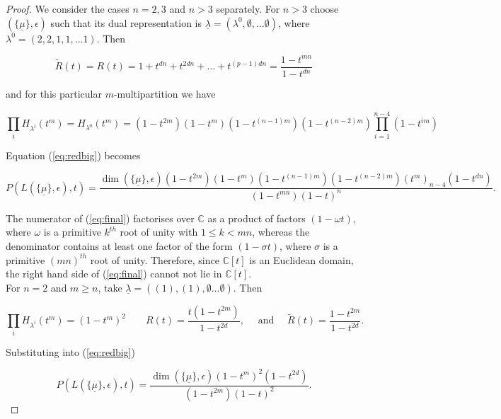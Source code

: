 \documentclass[a4apper,10pt]{amsart}
\theoremstyle{definition}
\numberwithin{thm}{section}
\newcommand{\C}{\mathbb{C}}
\begin{document}
\begin{proof}We consider the cases $n = 2,3$ and $n > 3$ separately. For $n > 3$ choose $( \{ \underline{\mu} \},\epsilon)$ such that its dual representation is $\underline{\lambda} = (\lambda^0, \emptyset, \dots \emptyset )$, where $\lambda^0 = (2,2,1,1, \dots 1)$. Then 

\begin{displaymath}
\tilde{R}(t) = R(t) = 1 + t^{dn} + t^{2dn} + \dots + t^{(p-1)dn} = \frac{1 - t^{mn}}{1 - t^{dn}}
\end{displaymath}

\noindent and for this particular $m$-multipartition we have

\begin{displaymath}
\prod_i H_{\lambda^i}(t^m) = H_{\lambda^0}(t^m) = (1 - t^{2m})(1 - t^m)(1 - t^{(n-1)m})(1 - t^{(n-2)m})\prod_{i = 1}^{n-4} (1-t^{im})
\end{displaymath}

\noindent Equation (\ref{eq:redbig}) becomes

\begin{equation}\label{eq:final}
P(L( \{ \underline{\mu} \},\epsilon),t) = \frac{\dim ( \{ \underline{\mu} \},\epsilon) (1 - t^{2m})(1 - t^m)(1 - t^{(n-1)m})(1 - t^{(n-2)m})(t^m)_{n-4} (1 - t^{dn})  }{(1 - t^{mn})(1-t)^n}.
\end{equation}

\noindent The numerator of (\ref{eq:final}) factorises over $\C$ as a product of factors $(1 - \omega t)$, where $\omega$ is a primitive $k^{th}$ root of unity with $1 \le k < mn$, whereas the denominator contains at least one factor of the form $(1 - \sigma t)$, where $\sigma$ is a primitive $(mn)^{th}$ root of unity. Therefore, since $\C[t]$ is an Euclidean domain, the right hand side of (\ref{eq:final}) cannot not lie in $\C [t]$.\\

\noindent For $n = 2$ and $m \ge n$, take $\underline{\lambda} = ((1), (1), \emptyset \dots \emptyset )$. Then

\begin{displaymath}
\prod_i H_{\lambda^i}(t^m) = (1 - t^m)^2 \qquad R(t) = \frac{t(1 - t^{2m})}{1 - t^{2d}}, \quad  \textrm{ and } \quad \tilde{R}(t) = \frac{1 - t^{2m}}{1 - t^{2d}}.
\end{displaymath}

\noindent Substituting into (\ref{eq:redbig}) 

\begin{displaymath}
P(L( \{ \underline{\mu} \},\epsilon),t) = \frac{\dim ( \{ \underline{\mu} \},\epsilon) (1 - t^m)^2 (1 - t^{2d})}{(1 - t^{2m})(1 - t)^2}.
\end{displaymath}


\end{proof}
\end{document}
